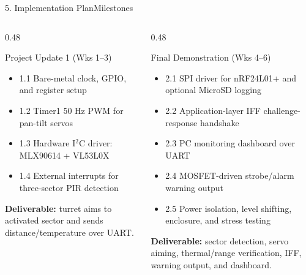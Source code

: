 \documentclass[aspectratio=169, 10pt]{beamer}
\begin{document}
\begin{frame}{5. Implementation Plan}{Milestones}
    \begin{columns}[T]
        \begin{column}{0.48\textwidth}
            \begin{block}{Project Update 1 (Wks 1--3)}
                \footnotesize
                \begin{itemize}
                    \item 1.1 Bare-metal clock, GPIO, and register setup
                    \item 1.2 Timer1 50 Hz PWM for pan-tilt servos
                    \item 1.3 Hardware I$^2$C driver: MLX90614 + VL53L0X
                    \item 1.4 External interrupts for three-sector PIR detection
                \end{itemize}
                \textbf{Deliverable:} turret aims to activated sector and sends distance/temperature over UART.
            \end{block}
        \end{column}
        \begin{column}{0.48\textwidth}
            \begin{block}{Final Demonstration (Wks 4--6)}
                \footnotesize
                \begin{itemize}
                    \item 2.1 SPI driver for nRF24L01+ and optional MicroSD logging
                    \item 2.2 Application-layer IFF challenge-response handshake
                    \item 2.3 PC monitoring dashboard over UART
                    \item 2.4 MOSFET-driven strobe/alarm warning output
                    \item 2.5 Power isolation, level shifting, enclosure, and stress testing
                \end{itemize}
                \textbf{Deliverable:} sector detection, servo aiming, thermal/range verification, IFF, warning output, and dashboard.
            \end{block}
        \end{column}
    \end{columns}
\end{frame}
\end{document}
